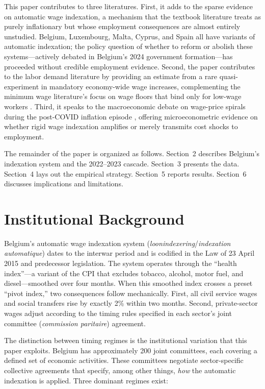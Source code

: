 \documentclass[12pt]{article}
\begin{document}
This paper contributes to three literatures. First, it adds to the sparse evidence on automatic wage indexation, a mechanism that the textbook literature treats as purely inflationary \citep{fischer1977,gray1976} but whose employment consequences are almost entirely unstudied. Belgium, Luxembourg, Malta, Cyprus, and Spain all have variants of automatic indexation; the policy question of whether to reform or abolish these systems---actively debated in Belgium's 2024 government formation---has proceeded without credible employment evidence. Second, the paper contributes to the labor demand literature by providing an estimate from a rare quasi-experiment in mandatory economy-wide wage increases, complementing the minimum wage literature's focus on wage floors that bind only for low-wage workers \citep{cengiz2019,dube2019}. Third, it speaks to the macroeconomic debate on wage-price spirals during the post-COVID inflation episode \citep{blanchard2022,lorenzoni2023}, offering microeconometric evidence on whether rigid wage indexation amplifies or merely transmits cost shocks to employment.

The remainder of the paper is organized as follows. Section~2 describes Belgium's indexation system and the 2022--2023 cascade. Section~3 presents the data. Section~4 lays out the empirical strategy. Section~5 reports results. Section~6 discusses implications and limitations.


\section{Institutional Background}

Belgium's automatic wage indexation system (\textit{loonindexering}/\textit{indexation automatique}) dates to the interwar period and is codified in the Law of 23 April 2015 and predecessor legislation. The system operates through the ``health index''---a variant of the CPI that excludes tobacco, alcohol, motor fuel, and diesel---smoothed over four months. When this smoothed index crosses a preset ``pivot index,'' two consequences follow mechanically. First, all civil service wages and social transfers rise by exactly 2\% within two months. Second, private-sector wages adjust according to the timing rules specified in each sector's joint committee (\textit{commission paritaire}) agreement.

The distinction between timing regimes is the institutional variation that this paper exploits. Belgium has approximately 200 joint committees, each covering a defined set of economic activities. These committees negotiate sector-specific collective agreements that specify, among other things, \textit{how} the automatic indexation is applied. Three dominant regimes exist:
\end{document}
